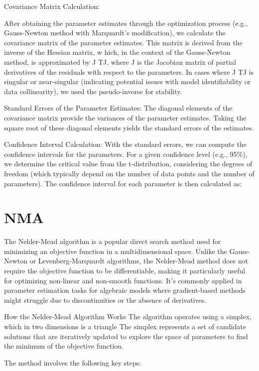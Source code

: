 \documentclass[17pt]{extarticle} %
\begin{document}
Covariance Matrix Calculation:

After obtaining the parameter estimates through the optimization process (e.g., Gauss-Newton method with Marquardt's modification), 
we calculate the covariance matrix of the parameter estimates. This matrix is derived from the inverse of the Hessian matrix, w
hich, in the context of the Gauss-Newton method, is approximated by 
J TJ, where J is the Jacobian matrix of partial derivatives of the residuals with respect to the parameters.
In cases where J TJ is singular or near-singular (indicating potential issues with model identifiability or data collinearity), 
we used the pseudo-inverse for stability.

Standard Errors of the Parameter Estimates: The diagonal elements of the covariance matrix provide the variances of the 
parameter estimates. Taking the square root of these diagonal elements yields the standard errors of the estimates.

Confidence Interval Calculation: With the standard errors, we can compute the confidence intervals for the 
parameters. For a given confidence level (e.g., 95\%), we determine the critical value from the t-distribution, 
considering the degrees of freedom (which typically depend on the number of data points and the number of parameters).
The confidence interval for each parameter is then calculated as: 
\section*{NMA}

The Nelder-Mead algorithm is a popular direct search method used for minimizing an objective function in a 
multidimensional space. Unlike the Gauss-Newton or Levenberg-Marquardt algorithms, the Nelder-Mead method 
does not require the objective function to be differentiable, making it particularly useful for optimizing 
non-linear and non-smooth functions. It's commonly applied in parameter estimation tasks for algebraic
models where gradient-based methods might struggle due to discontinuities or the absence of derivatives.

How the Nelder-Mead Algorithm Works
The algorithm operates using a simplex, which in two dimensions is a triangle The simplex represents a set of candidate 
solutions that are iteratively updated to explore the space of parameters to find the minimum of the objective function. 

The method involves the following key steps:
\end{document}
